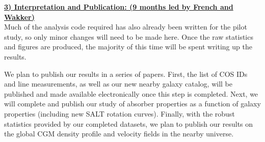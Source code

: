 \documentclass[12pt]{article}
\begin{document}
\noindent \textbf{\underline{3) Interpretation and Publication: (9 months led by French and Wakker)}}\\
\indent Much of the analysis code required has also already been written for the pilot study, so only minor changes will need to be made here. Once the raw statistics and figures are produced, the majority of this time will be spent writing up the results. 

We plan to publish our results in a series of papers. First, the list of COS IDs and line measurements, as well as our new nearby galaxy catalog, will be published and made available electronically once this step is completed. Next, we will complete and publish our study of absorber properties as a function of galaxy properties (including new SALT rotation curves). Finally, with the robust statistics provided by our completed datasets, we plan to publish our results on the global CGM density profile and velocity fields in the nearby universe.
\end{document}
